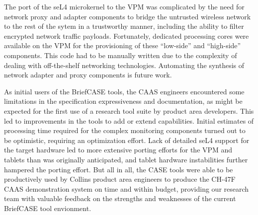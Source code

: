 
The port of the seL4 microkernel to the VPM was complicated by the need for network
proxy and adapter components to bridge the untrusted wireless network to the rest of the sytem in a trustworthy
manner, including the ability to filter encrypted network traffic payloads. Fortunately, dedicated
processing cores were available on the VPM for the provisioning of these ``low-side'' and ``high-side''
components. This code had to be manually written due to the complexity of dealing with
off-the-shelf networking technologies.  Automating the synthesis of network adapter and proxy components
is future work.

As initial users of the BriefCASE tools, the CAAS engineers encountered some limitations in the
specification expressiveness and documentation, as might be
expected for the first use of a research tool suite by product area developers. 
This led to improvements in the tools to add or extend capabilities.  Initial estimates of
processing time required for the complex monitoring components turned out to be optimistic,
requiring an optimization effort. Lack of detailed seL4 support for the target hardware led to more
extensive porting efforts for the VPM and tablets than was originally anticipated, and tablet
hardware instabilities further hampered the porting effort. But all in all, the CASE tools were able
to be productively used by Collins product area engineers to produce the CH-47F CAAS demonstration
system on time and within budget, providing our research team with valuable feedback on the
strengths and weaknesses of the current BriefCASE tool envionment.
